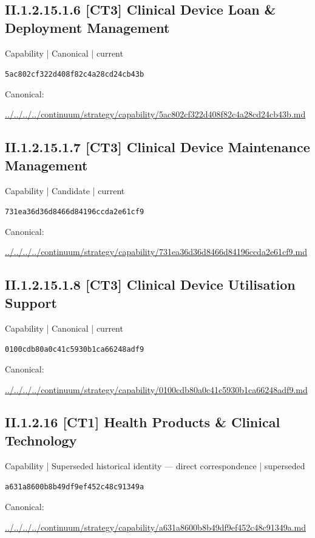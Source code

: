 \documentclass[10pt,a4paper]{article}
\begin{document}
\subsection*{II.1.2.15.1.6 [CT3] Clinical Device Loan \& Deployment Management}
{\small Capability | Canonical | current}\par
\texttt{5ac802cf322d408f82c4a28cd24cb43b}\par
Canonical: \par
{\footnotesize\url{../../../../continuum/strategy/capability/5ac802cf322d408f82c4a28cd24cb43b.md}}\par
\subsection*{II.1.2.15.1.7 [CT3] Clinical Device Maintenance Management}
{\small Capability | Candidate | current}\par
\texttt{731ea36d36d8466d84196ccda2e61cf9}\par
Canonical: \par
{\footnotesize\url{../../../../continuum/strategy/capability/731ea36d36d8466d84196ccda2e61cf9.md}}\par
\subsection*{II.1.2.15.1.8 [CT3] Clinical Device Utilisation Support}
{\small Capability | Canonical | current}\par
\texttt{0100cdb80a0c41c5930b1ca66248adf9}\par
Canonical: \par
{\footnotesize\url{../../../../continuum/strategy/capability/0100cdb80a0c41c5930b1ca66248adf9.md}}\par
\subsection*{II.1.2.16 [CT1] Health Products \& Clinical Technology}
{\small Capability | Superseded historical identity — direct correspondence | superseded}\par
\texttt{a631a8600b8b49df9ef452c48c91349a}\par
Canonical: \par
{\footnotesize\url{../../../../continuum/strategy/capability/a631a8600b8b49df9ef452c48c91349a.md}}\par
\end{document}
